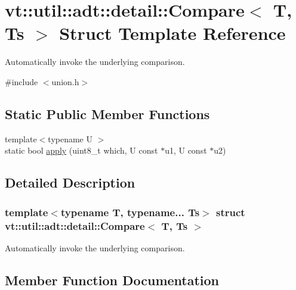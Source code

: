 \hypertarget{structvt_1_1util_1_1adt_1_1detail_1_1_compare}{}\section{vt\+:\+:util\+:\+:adt\+:\+:detail\+:\+:Compare$<$ T, Ts $>$ Struct Template Reference}
\label{structvt_1_1util_1_1adt_1_1detail_1_1_compare}


Automatically invoke the underlying comparison.  




{\ttfamily \#include $<$union.\+h$>$}

\subsection*{Static Public Member Functions}
\begin{DoxyCompactItemize}
\item 
{\footnotesize template$<$typename U $>$ }\\static bool \hyperlink{structvt_1_1util_1_1adt_1_1detail_1_1_compare_a0108d5695f7321af0cc807e0281d2f20}{apply} (uint8\+\_\+t which, U const $\ast$u1, U const $\ast$u2)
\end{DoxyCompactItemize}


\subsection{Detailed Description}
\subsubsection*{template$<$typename T, typename... Ts$>$\newline
struct vt\+::util\+::adt\+::detail\+::\+Compare$<$ T, Ts $>$}

Automatically invoke the underlying comparison. 

\subsection{Member Function Documentation}
\mbox{\label{structvt_1_1util_1_1adt_1_1detail_1_1_compare_a0108d5695f7321af0cc807e0281d2f20}} 
